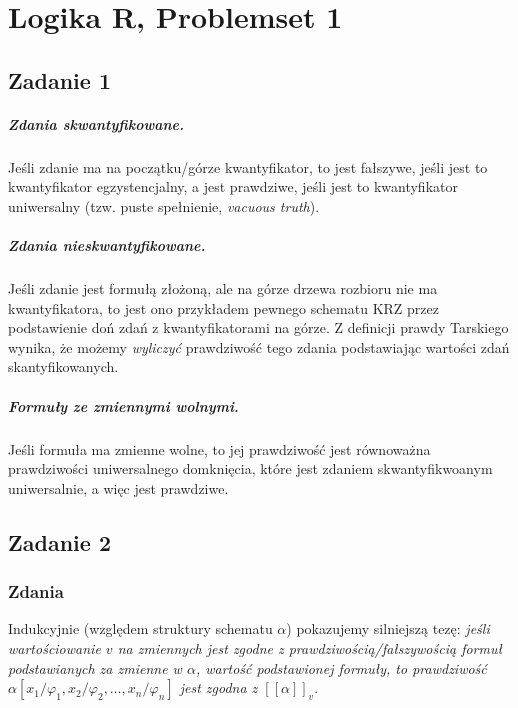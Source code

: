 \chapter{Logika R, Problemset 1}

\section*{Zadanie 1}

\paragraph{Zdania skwantyfikowane.} Jeśli zdanie ma na początku/górze kwantyfikator, to jest fałszywe, jeśli jest to kwantyfikator egzystencjalny, a jest prawdziwe, jeśli jest to kwantyfikator uniwersalny (tzw. puste spełnienie, \textit{vacuous truth}).

\paragraph{Zdania nieskwantyfikowane.} Jeśli zdanie jest formułą złożoną, ale na górze drzewa rozbioru nie ma kwantyfikatora, to jest ono przykładem pewnego schematu KRZ przez podstawienie doń zdań z kwantyfikatorami na górze. Z definicji prawdy Tarskiego wynika, że możemy \textit{wyliczyć} prawdziwość tego zdania podstawiając wartości zdań skantyfikowanych.

\paragraph{Formuły ze zmiennymi wolnymi.}  Jeśli formuła ma zmienne wolne, to jej prawdziwość jest równoważna prawdziwości uniwersalnego domknięcia, które jest zdaniem skwantyfikwoanym uniwersalnie, a więc jest prawdziwe.

\section*{Zadanie 2}

\subsection*{Zdania} Indukcyjnie (względem struktury schematu \( \alpha \)) pokazujemy silniejszą tezę: \textit{jeśli wartościowanie \( v \) na zmiennych jest zgodne z prawdziwością/fałszywością formuł podstawianych za zmienne w \( \alpha \), wartość podstawionej formuły, to prawdziwość \( \alpha[x_1/\varphi_1, x_2/\varphi_2, \ldots, x_n/\varphi_n] \) jest zgodna z \( [[\alpha]]_v \)}.

